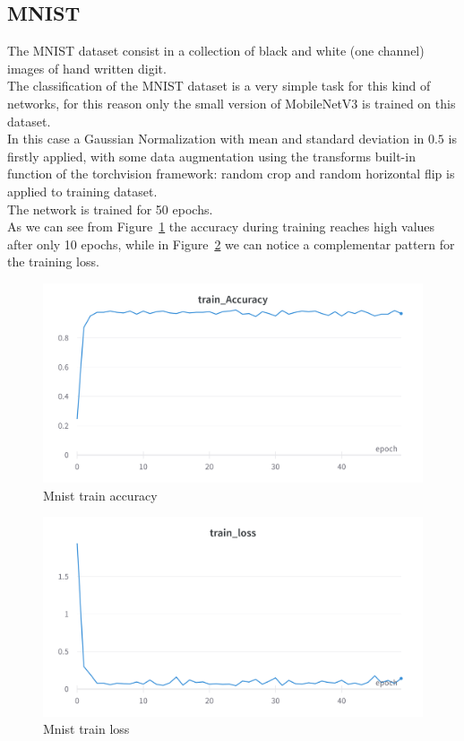 \documentclass[12pt, letterpaper, twoside]{article}
\begin{document}
\subsection{MNIST}
The MNIST dataset consist in a collection of black and white (one channel) images of hand written digit.\\
The classification of the MNIST dataset is a very simple task for this kind of networks, for this reason only the small version of MobileNetV3 is trained on this dataset.\\
In this case a Gaussian Normalization with mean and standard deviation in $0.5$ is firstly applied, with some data augmentation using the transforms built-in function of the torchvision framework: random crop and random horizontal flip is applied to training dataset.\\
The network is trained for 50 epochs.\\
As we can see from Figure~\ref{fig:mnist_acc} the accuracy during training reaches high values after only 10 epochs, while in Figure~\ref{fig:mnist_loss} we can notice a complementar pattern for the training loss.\\

\begin{figure}[h]
	\centering
	\includegraphics[width=.7\textwidth]{mnet_small_mnist_accuracy.png}
	\caption{Mnist train accuracy}
	\label{fig:mnist_acc}
\end{figure}

\begin{figure}[h]
	\centering
	\includegraphics[width=.7\textwidth]{mnet_small_mnist_loss.png}
	\caption{Mnist train loss}
	\label{fig:mnist_loss}
\end{figure}
\end{document}
